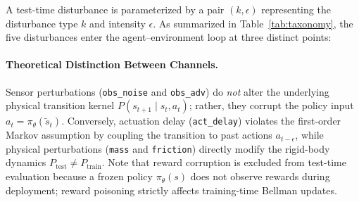 \documentclass{article}
\begin{document}
A test-time disturbance is parameterized by a pair $(k, \epsilon)$ representing the disturbance type $k$ and intensity $\epsilon$. As summarized in Table~\ref{tab:taxonomy}, the five disturbances enter the agent--environment loop at three distinct points:

\begin{table}[H]
\centering
\caption{Taxonomy of the five test-time disturbances evaluated in this study.}
\label{tab:taxonomy}
\end{table}

\paragraph{Theoretical Distinction Between Channels.}
Sensor perturbations (\texttt{obs\_noise} and \texttt{obs\_adv}) do \emph{not} alter the underlying physical transition kernel $P(s_{t+1} \mid s_t, a_t)$; rather, they corrupt the policy input $a_t = \pi_\theta(\tilde{s}_t)$. Conversely, actuation delay (\texttt{act\_delay}) violates the first-order Markov assumption by coupling the transition to past actions $a_{t-\epsilon}$, while physical perturbations (\texttt{mass} and \texttt{friction}) directly modify the rigid-body dynamics $P_{\text{test}} \neq P_{\text{train}}$. Note that reward corruption is excluded from test-time evaluation because a frozen policy $\pi_\theta(s)$ does not observe rewards during deployment; reward poisoning strictly affects training-time Bellman updates.
\end{document}
